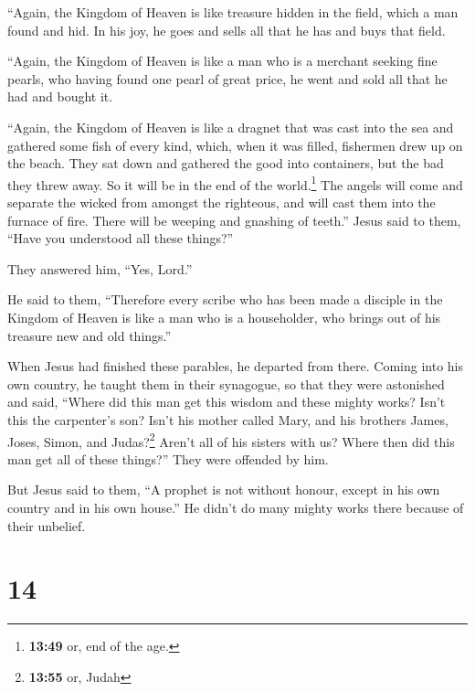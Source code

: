  ``Again, the Kingdom of Heaven is like treasure hidden
in the field, which a man found and hid. In his joy, he goes and sells
all that he has and buys that field.

 ``Again, the Kingdom of Heaven is like a man who is a
merchant seeking fine pearls,  who having found one pearl
of great price, he went and sold all that he had and bought it.

 ``Again, the Kingdom of Heaven is like a dragnet that
was cast into the sea and gathered some fish of every kind,
 which, when it was filled, fishermen drew up on the
beach. They sat down and gathered the good into containers, but the bad
they threw away.  So it will be in the end of the
world.\footnote{\textbf{13:49} or, end of the age.} The angels will come
and separate the wicked from amongst the righteous,  and
will cast them into the furnace of fire. There will be weeping and
gnashing of teeth.''  Jesus said to them, ``Have you
understood all these things?''

They answered him, ``Yes, Lord.''

 He said to them, ``Therefore every scribe who has been
made a disciple in the Kingdom of Heaven is like a man who is a
householder, who brings out of his treasure new and old things.''

 When Jesus had finished these parables, he departed from
there.  Coming into his own country, he taught them in
their synagogue, so that they were astonished and said, ``Where did this
man get this wisdom and these mighty works?  Isn't this
the carpenter's son? Isn't his mother called Mary, and his brothers
James, Joses, Simon, and Judas?\footnote{\textbf{13:55} or, Judah}
 Aren't all of his sisters with us? Where then did this
man get all of these things?''  They were offended by
him.

But Jesus said to them, ``A prophet is not without honour, except in his
own country and in his own house.''  He didn't do many
mighty works there because of their unbelief.

\hypertarget{section-13}{%
\section{14}\label{section-13}}

